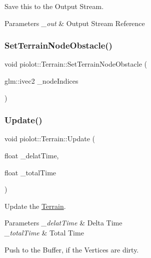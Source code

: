 Save this to the Output Stream. 


\begin{DoxyParams}{Parameters}
{\em \+\_\+out} & Output Stream Reference \\
\hline
\end{DoxyParams}
\mbox{\label{classpiolot_1_1_terrain_a6ec5d3beab0a60517cff5603b66fd19e}} 
\subsubsection{\texorpdfstring{Set\+Terrain\+Node\+Obstacle()}{SetTerrainNodeObstacle()}}
{\footnotesize\ttfamily void piolot\+::\+Terrain\+::\+Set\+Terrain\+Node\+Obstacle (\begin{DoxyParamCaption}\item[{glm\+::ivec2}]{\+\_\+node\+Indices }\end{DoxyParamCaption})}

\mbox{\label{classpiolot_1_1_terrain_a54f2eb43b93352f7584569f15a7dc824}} 
\subsubsection{\texorpdfstring{Update()}{Update()}}
{\footnotesize\ttfamily void piolot\+::\+Terrain\+::\+Update (\begin{DoxyParamCaption}\item[{float}]{\+\_\+delat\+Time,  }\item[{float}]{\+\_\+total\+Time }\end{DoxyParamCaption})}



Update the \mbox{\hyperlink{classpiolot_1_1_terrain}{Terrain}}. 


\begin{DoxyParams}{Parameters}
{\em \+\_\+delat\+Time} & Delta Time \\
\hline
{\em \+\_\+total\+Time} & Total Time\\
\hline
\end{DoxyParams}
Push to the Buffer, if the Vertices are dirty. 

